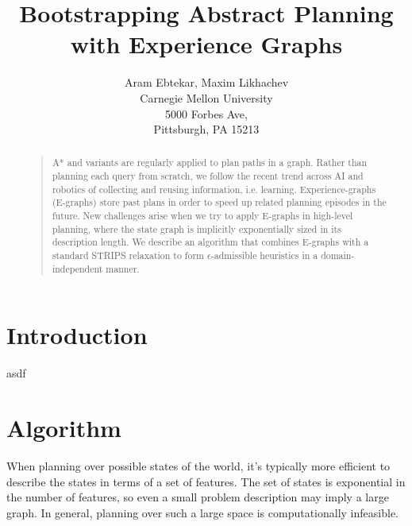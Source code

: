 \documentclass[letterpaper]{article}
\begin{document}
%
\title{Bootstrapping Abstract Planning with Experience Graphs}
\author{Aram Ebtekar, Maxim Likhachev\\
Carnegie Mellon University\\
5000 Forbes Ave,\\
Pittsburgh, PA 15213\\
}
\maketitle
\begin{abstract}
\begin{quote}
A* and variants are regularly applied to plan paths in a graph. Rather than planning each query from scratch, we follow the recent trend across AI and robotics of collecting and reusing information, i.e. learning. Experience-graphs (E-graphs) store past plans in order to speed up related planning episodes in the future. New challenges arise when we try to apply E-graphs in high-level planning, where the state graph is implicitly exponentially sized in its description length. We describe an algorithm that combines E-graphs with a standard STRIPS relaxation to form $\epsilon$-admissible heuristics in a domain-independent manner.
\end{quote}
\end{abstract}

\section{Introduction}
asdf

\section{Algorithm}
When planning over possible states of the world, it's typically more efficient to describe the states in terms of a set of features. The set of states is exponential in the number of features, so even a small problem description may imply a large graph. In general, planning over such a large space is computationally infeasible.
\end{document}

